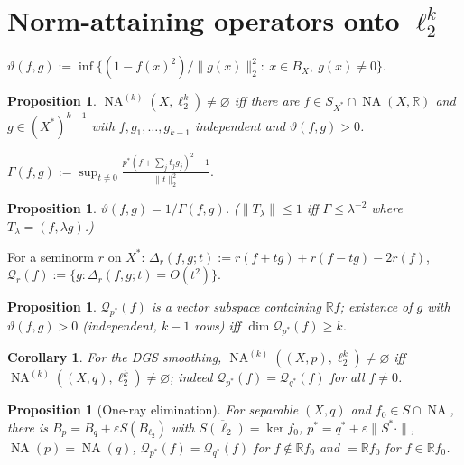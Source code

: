 \documentclass[10pt]{amsart}
\newtheorem{proposition}[theorem]{Proposition}
\newtheorem{corollary}[theorem]{Corollary}
\theoremstyle{remark}
\newcommand{\R}{\mathbb{R}}
\newcommand{\NA}{\operatorname{NA}}
\begin{document}
\section{Norm-attaining operators onto $\ell_2^k$}\label{sec:rank-k}
$\vartheta(f,g):=\inf\{(1-f(x)^2)/\|g(x)\|_2^2:\ x\in B_X,\ g(x)\neq0\}$.
\begin{proposition}\label{prop:quadratic-characterization}
$\NA^{(k)}(X,\ell_2^k)\neq\varnothing$ iff there are $f\in S_{X^*}\cap\NA(X,\R)$ and $g\in(X^*)^{k-1}$ with $f,g_1,\dots,g_{k-1}$ independent and $\vartheta(f,g)>0$.
\end{proposition}
$\Gamma(f,g):=\sup_{t\ne0}\frac{p^*(f+\sum_jt_jg_j)^2-1}{\|t\|_2^2}$.
\begin{proposition}\label{prop:theta-dual}
$\vartheta(f,g)=1/\Gamma(f,g)$. ($\|T_\lambda\|\le1$ iff $\Gamma\le\lambda^{-2}$ where $T_\lambda=(f,\lambda g)$.)
\end{proposition}
For a seminorm $r$ on $X^*$: $\Delta_r(f,g;t):=r(f+tg)+r(f-tg)-2r(f)$, $\mathcal{Q}_r(f):=\{g:\Delta_r(f,g;t)=O(t^2)\}$.
\begin{proposition}\label{prop:quadratic-directions}
$\mathcal{Q}_{p^*}(f)$ is a vector subspace containing $\R f$; existence of $g$ with $\vartheta(f,g)>0$ (independent, $k-1$ rows) iff $\dim\mathcal{Q}_{p^*}(f)\ge k$.
\end{proposition}
\begin{corollary}\label{cor:dgs-rank-k}
For the DGS smoothing, $\NA^{(k)}((X,p),\ell_2^k)\neq\varnothing$ iff $\NA^{(k)}((X,q),\ell_2^k)\neq\varnothing$; indeed $\mathcal Q_{p^*}(f)=\mathcal Q_{q^*}(f)$ for all $f\ne0$.
\end{corollary}
\begin{proposition}[One-ray elimination]\label{prop:one-ray-elimination}
For separable $(X,q)$ and $f_0\in S\cap\NA$, there is $B_p=B_q+\varepsilon S(B_{\ell_2})$ with $\overline{S(\ell_2)}=\ker f_0$, $p^*=q^*+\varepsilon\|S^*\cdot\|$, $\NA(p)=\NA(q)$, $\mathcal Q_{p^*}(f)=\mathcal Q_{q^*}(f)$ for $f\notin\R f_0$ and $=\R f_0$ for $f\in\R f_0$.
\end{proposition}
\end{document}

